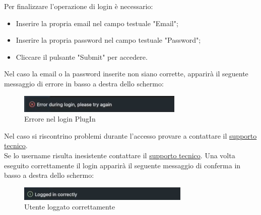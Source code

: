 \documentclass{article}
\begin{document}
Per finalizzare l'operazione di login è necessario:
\begin{itemize}
    \item Inserire la propria email nel campo testuale "Email";
    \item Inserire la propria password nel campo testuale "Password";
    \item Cliccare il pulsante "Submit" per accedere.
\end{itemize}
Nel caso la email o la password inserite non siano corrette, apparirà il seguente messaggio di errore in basso a destra dello schermo:
    \begin{figure}[H]
      \centering
      \includegraphics{documenti/Screenshot manuale utente/errore login.png}
      \caption{Errore nel login PlugIn}
      \label{errlogplg}
    \end{figure}
    Nel caso si riscontrino problemi durante l'accesso provare a contattare il \hyperlink{linkSup}{supporto tecnico}. \\
Se lo username risulta inesistente contattare il \hyperlink{linkSup}{supporto tecnico}.
Una volta eseguito correttamente il login apparirà il seguente messaggio di conferma in basso a destra dello schermo: 
    \begin{figure}[H]
      \centering
      \includegraphics{documenti/Screenshot manuale utente/utente loggato.png}
      \caption{Utente loggato correttamente}
      \label{logcorretto}
    \end{figure}
\end{document}
